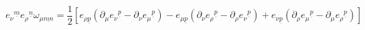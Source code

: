 \begin{equation}
e_{\nu }{}^{\underline{m}}e_{\rho }{}^{\underline{n}}\omega _{\mu \underline{mn}}=\frac{1%
}{2}[e_{\rho \underline{p}}(\partial _{\mu }e_{\nu }{}^{\underline{p}%
}-\partial _{\nu }e_{\mu }{}^{\underline{p}})-e_{\mu \underline{p}}(\partial
_{\nu }e_{\rho }{}^{\underline{p}}-\partial _{\rho }e_{\nu }{}^{\underline{p}%
})+e_{\nu {\underline{p}}}(\partial _{\rho }e_{\mu }{}^{\underline{p}%
}-\partial _{\mu }e_{\rho }{}^{\underline{p}})]
\end{equation}

